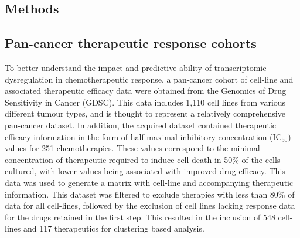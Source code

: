 \documentclass[10pt, letterpaper]{article}
\newcommand{\foo}[1]{%
  \ifthenelse{\equal{#1}{missing}}
    {}
    {\scriptsize $H^{(1)}_{\l}$}
}
\newcommand{\hehe}[1]{%
  \ifthenelse{\equal{#1}{missing}}
    {}
    {\scriptsize $H^{(2)}_{\l}$}
}
\newcommand{\hehetwo}[1]{%
  \ifthenelse{\equal{#1}{missing}}
    {}
    {\scriptsize $H^{(3)}_{\l}$}
}
\newcommand{\lmao}[1]{%
  \ifthenelse{\equal{#1}{missing}}
    {}
    {\scriptsize $I_{\l}$}
}
\begin{document}
\begin{multicols}{2}
\section{Methods}

\subsection*{Pan-cancer therapeutic response cohorts}
To better understand the impact and predictive ability of transcriptomic dysregulation in chemotherapeutic response, a pan-cancer cohort of cell-line and associated therapeutic efficacy data were obtained from the Genomics of Drug Sensitivity in Cancer (GDSC). This data includes 1,110 cell lines from various different tumour types, and is thought to represent a relatively comprehensive pan-cancer dataset. In addition, the acquired dataset contained therapeutic efficacy information in the form of half-maximal inhibitory concentration (IC$_{50}$) values for 251 chemotherapies. These values correspond to the minimal concentration of therapeutic required to induce cell death in 50\% of the cells cultured, with lower values being associated with improved drug efficacy. This data was used to generate a matrix with cell-line and accompanying therapeutic information. This dataset was filtered to exclude therapies with less than 80\% of data for all cell-lines, followed by the exclusion of cell lines lacking response data for the drugs retained in the first step. This resulted in the inclusion of 548 cell-lines and 117 therapeutics for clustering based analysis.


\begin{figure}[!ht]
    \centering
\end{figure}
\end{multicols}
\end{document}
